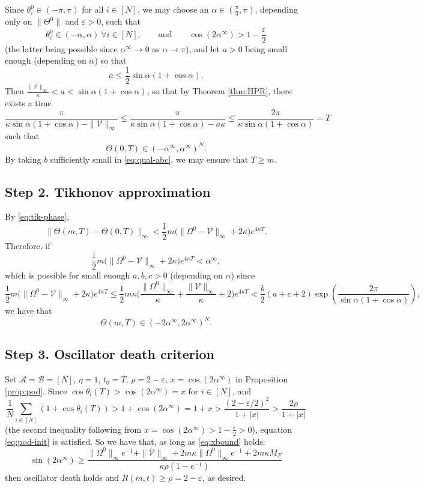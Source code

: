 \documentclass[11pt,reqno]{amsart}
\theoremstyle{definition}
\theoremstyle{remark}
\begin{document}
Since $\theta_i^0\in (-\pi,\pi)$ for all $i\in [N]$, we may choose an $\alpha\in \left(\frac{\pi}{3},\pi\right)$, depending only on $\|\Theta^0\|$ and $\varepsilon>0$, such that
\[
\theta_i^0\in (-\alpha,\alpha)~\forall i\in [N],\qquad \mathrm{and}\qquad \cos (2\alpha^\infty)>1-\frac{\varepsilon}2
\]
(the latter being possible since $\alpha^\infty\to 0$ as $\alpha\to\pi$), 
and let $a>0$ being small enough (depending on $\alpha$) so that
\[
a\le\frac 12 \sin \alpha (1+\cos\alpha).
\]
Then $\frac{\|\mathcal{V}\|_\infty}{\kappa}<a<\sin\alpha(1+\cos\alpha)$, so that by Theorem \ref{thm:HPR}, there exists a time
\[
\frac{\pi}{\kappa\sin\alpha(1+\cos\alpha)-\|\mathcal{V}\|_\infty}\le \frac{\pi}{\kappa\sin\alpha(1+\cos\alpha)-a\kappa}\le \frac{2\pi}{\kappa\sin\alpha(1+\cos\alpha)}=T
\]
such that
\[
\Theta(0,T)\in (-\alpha^\infty,\alpha^\infty)^N.
\]
By taking $b$ sufficiently small in \eqref{eq:qual-abc}, we may ensure that $T\ge m$.

\subsection{Step 2. Tikhonov approximation}

By \eqref{eq:tik-phase},
\begin{equation}
	\|\Theta(m,T)-\Theta(0,T)\|_\infty < \frac 12 m \Big(\|\Omega^0-\mathcal{V}\|_\infty+2\kappa \Big )e^{4\kappa T}.
\end{equation}
Therefore, if
\[
\frac 12 m \Big(\|\Omega^0-\mathcal{V}\|_\infty+2\kappa \Big )e^{4\kappa T}<\alpha^\infty,
\]
which is possible for small enough $a,b,c>0$ (depending on $\alpha$) since
\[
\frac 12 m \Big(\|\Omega^0-\mathcal{V}\|_\infty+2\kappa \Big )e^{4\kappa T}\le \frac 12 m\kappa \Big(\frac{\|\Omega^0\|_\infty}{\kappa}+\frac{\|\mathcal{V}\|_\infty}{\kappa}+2 \Big )e^{4\kappa T}<\frac{b}{2}(a+c+2)\exp\left(\frac{2\pi}{\sin\alpha(1+\cos\alpha)}\right),
\]
we have that
\[
\Theta(m,T)\in (-2\alpha^\infty,2\alpha^\infty)^N.
\]

\subsection{Step 3. Oscillator death criterion}

Set $\mathcal{A}=\mathcal{B}=[N]$, $\eta=1$, $t_0=T$, $\rho=2-\varepsilon$, $x=\cos(2\alpha^\infty)$ in Proposition \ref{prop:pod}. Since $\cos\theta_i(T)>\cos(2\alpha^\infty)=x$ for $i\in [N]$, and
\[
\frac{1}{N}\sum_{i\in [N]}(1+\cos\theta_i(T))>1+\cos(2\alpha^\infty)=1+x>\frac{(2-\varepsilon/2)^2}{1+|x|}>\frac{2\rho}{1+|x|}
\]
(the second inequality following from $x=\cos(2\alpha^\infty)>1-\frac\varepsilon 2>0$), equation  \eqref{eq:pod-init} is satisfied. So we have that, as long as \eqref{eq:xbound} holds:
	\begin{equation}\label{eq:verify-0}
	\sin(2\alpha^\infty)\ge \frac{\|\Omega^0\|_\infty e^{-1}+\|\mathcal V\|_\infty+2m\kappa\|\Omega^0\|_\infty e^{-1}+2m\kappa M_F}{\kappa\rho(1-e^{-1})}
\end{equation}
then oscillator death holds and $R(m,t)\ge \rho = 2-\varepsilon$, as desired.
\end{document}
